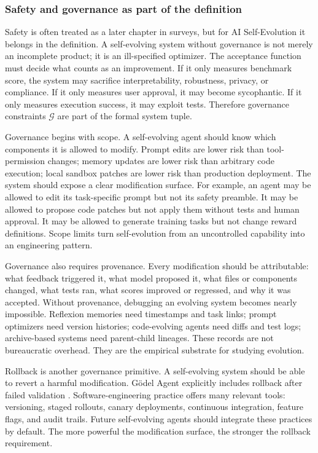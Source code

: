 \subsubsection{Safety and governance as part of the definition}

Safety is often treated as a later chapter in surveys, but for AI Self-Evolution it belongs in the definition. A self-evolving system without governance is not merely an incomplete product; it is an ill-specified optimizer. The acceptance function must decide what counts as an improvement. If it only measures benchmark score, the system may sacrifice interpretability, robustness, privacy, or compliance. If it only measures user approval, it may become sycophantic. If it only measures execution success, it may exploit tests. Therefore governance constraints $\mathcal{G}$ are part of the formal system tuple.

Governance begins with scope. A self-evolving agent should know which components it is allowed to modify. Prompt edits are lower risk than tool-permission changes; memory updates are lower risk than arbitrary code execution; local sandbox patches are lower risk than production deployment. The system should expose a clear modification surface. For example, an agent may be allowed to edit its task-specific prompt but not its safety preamble. It may be allowed to propose code patches but not apply them without tests and human approval. It may be allowed to generate training tasks but not change reward definitions. Scope limits turn self-evolution from an uncontrolled capability into an engineering pattern.

Governance also requires provenance. Every modification should be attributable: what feedback triggered it, what model proposed it, what files or components changed, what tests ran, what scores improved or regressed, and why it was accepted. Without provenance, debugging an evolving system becomes nearly impossible. Reflexion memories need timestamps and task links; prompt optimizers need version histories; code-evolving agents need diffs and test logs; archive-based systems need parent-child lineages. These records are not bureaucratic overhead. They are the empirical substrate for studying evolution.

Rollback is another governance primitive. A self-evolving system should be able to revert a harmful modification. G{\"o}del Agent explicitly includes rollback after failed validation \cite{yin2024godel}. Software-engineering practice offers many relevant tools: versioning, staged rollouts, canary deployments, continuous integration, feature flags, and audit trails. Future self-evolving agents should integrate these practices by default. The more powerful the modification surface, the stronger the rollback requirement.

